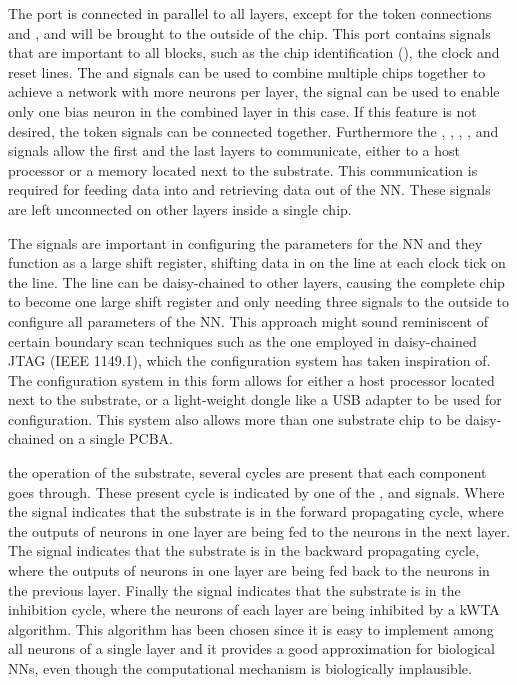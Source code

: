 The  port is connected in parallel to all layers, except for the token connections  and , and will be brought to the outside of the chip. This port contains signals that are important to all blocks, such as the chip identification (), the clock and reset lines. The  and  signals can be used to combine multiple chips together to achieve a network with more neurons per layer, the  signal can be used to enable only one bias neuron in the combined layer in this case. If this feature is not desired, the token signals can be connected together. Furthermore the , , , ,  and  signals allow the first and the last layers to communicate, either to a host processor or a memory located next to the substrate. This communication is required for feeding data into and retrieving data out of the \ac{NN}. These signals are left unconnected on other layers inside a single chip.

The  signals are important in configuring the parameters for the \ac{NN} and they function as a large shift register, shifting data in on the  line at each clock tick on the  line. The  line can be daisy-chained to other layers, causing the complete chip to become one large shift register and only needing three signals to the outside to configure all parameters of the \ac{NN}. This approach might sound reminiscent of certain boundary scan techniques such as the one employed in daisy-chained JTAG (IEEE 1149.1), which the configuration system has taken inspiration of. The configuration system in this form allows for either a host processor located next to the substrate, or a light-weight dongle like a USB adapter to be used for configuration. This system also allows more than one substrate chip to be daisy-chained on a single \ac{PCBA}.

 the operation of the substrate, several cycles are present that each component goes through. These present cycle is indicated by one of the ,  and  signals. Where the  signal indicates that the substrate is in the forward propagating cycle, where the outputs of neurons in one layer are being fed to the neurons in the next layer. The  signal indicates that the substrate is in the backward propagating cycle, where the outputs of neurons in one layer are being fed back to the neurons in the previous layer. Finally the  signal indicates that the substrate is in the inhibition cycle, where the neurons of each layer are being inhibited by a \ac{kWTA} algorithm. This algorithm has been chosen since it is easy to implement among all neurons of a single layer and it provides a good approximation for biological \acp{NN}, even though the computational mechanism is biologically implausible\cite{emergentkwta}.

